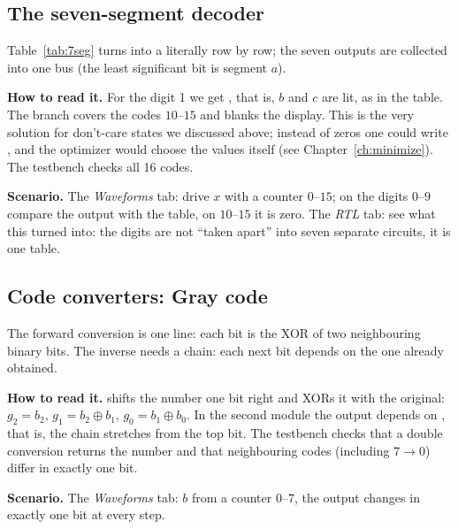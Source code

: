 \subsection{The seven-segment decoder}

Table~\ref{tab:7seg} turns into a  literally row by row; the seven
outputs are collected into one bus 
(the least significant bit is segment $a$).


\textbf{How to read it.} For the digit 1 we get , that is,
$b$ and $c$ are lit, as in the table. The  branch covers the
codes $10$--$15$ and blanks the display. This is the very solution for
don't-care states we discussed above; instead of zeros one could write ,
and the optimizer would choose the values itself (see Chapter~\ref{ch:minimize}).
The testbench  checks all 16 codes.

\textbf{Scenario.} The \emph{Waveforms} tab: drive $x$ with a counter $0$--$15$;
on the digits $0$--$9$ compare the output with the table, on $10$--$15$ it is zero.
The \emph{RTL} tab: see what this  turned into: the digits are
not ``taken apart'' into seven separate circuits, it is one table.

\subsection{Code converters: Gray code}

The forward conversion is one line: each bit is the XOR of two neighbouring
binary bits. The inverse needs a chain: each next bit depends on the one
already obtained.



\textbf{How to read it.}  shifts the number
one bit right and XORs it with the original: $g_2=b_2$, $g_1=b_2\oplus b_1$,
$g_0=b_1\oplus b_0$. In the second module the output  depends on
, that is, the chain stretches from the top bit. The testbench
 checks that a double conversion returns the number
and that neighbouring codes (including $7\to0$) differ in exactly one bit.

\textbf{Scenario.} The \emph{Waveforms} tab: $b$ from a counter $0$--$7$, the
output  changes in exactly one bit at every step.

